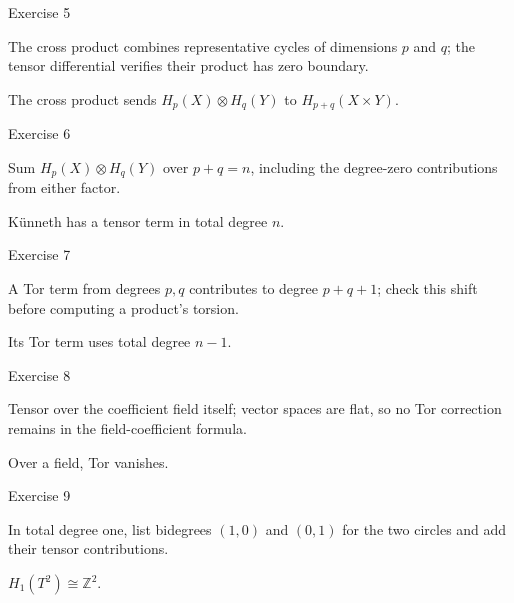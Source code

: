 \begin{exercise}\label{exr:viii27-05}
Exercise 5
\end{exercise}
\begin{hint}
The cross product combines representative cycles of dimensions \(p\) and \(q\); the tensor differential verifies their product has zero boundary.
\end{hint}
\begin{solution}
The cross product sends \(H_p(X)\otimes H_q(Y)\) to \(H_{p+q}(X\times Y)\).
\end{solution}

\begin{exercise}\label{exr:viii27-06}
Exercise 6
\end{exercise}
\begin{hint}
Sum \(H_p(X)\otimes H_q(Y)\) over \(p+q=n\), including the degree-zero contributions from either factor.
\end{hint}
\begin{solution}
Künneth has a tensor term in total degree \(n\).
\end{solution}

\begin{exercise}\label{exr:viii27-07}
Exercise 7
\end{exercise}
\begin{hint}
A Tor term from degrees \(p,q\) contributes to degree \(p+q+1\); check this shift before computing a product's torsion.
\end{hint}
\begin{solution}
Its Tor term uses total degree \(n-1\).
\end{solution}

\begin{exercise}\label{exr:viii27-08}
Exercise 8
\end{exercise}
\begin{hint}
Tensor over the coefficient field itself; vector spaces are flat, so no Tor correction remains in the field-coefficient formula.
\end{hint}
\begin{solution}
Over a field, Tor vanishes.
\end{solution}

\begin{exercise}\label{exr:viii27-09}
Exercise 9
\end{exercise}
\begin{hint}
In total degree one, list bidegrees \((1,0)\) and \((0,1)\) for the two circles and add their tensor contributions.
\end{hint}
\begin{solution}
\(H_1(T^2)\cong\mathbb Z^2\).
\end{solution}

